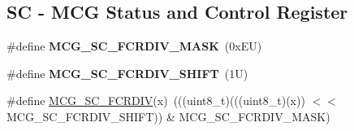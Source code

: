 \subsection*{SC -\/ M\+CG Status and Control Register}
\begin{DoxyCompactItemize}
\item 
\mbox{\label{group___m_c_g___register___masks_ga9b5d58f2f0a68eabe93f088dc2f81d2b}} 
\#define {\bfseries M\+C\+G\+\_\+\+S\+C\+\_\+\+F\+C\+R\+D\+I\+V\+\_\+\+M\+A\+SK}~(0x\+E\+U)
\item 
\mbox{\label{group___m_c_g___register___masks_gacc99cc05a01e5807395bfe11518b26e3}} 
\#define {\bfseries M\+C\+G\+\_\+\+S\+C\+\_\+\+F\+C\+R\+D\+I\+V\+\_\+\+S\+H\+I\+FT}~(1\+U)
\item 
\#define \mbox{\hyperlink{group___m_c_g___register___masks_ga50a0225002267599fa7a2fc341fa783a}{M\+C\+G\+\_\+\+S\+C\+\_\+\+F\+C\+R\+D\+IV}}(x)~(((uint8\+\_\+t)(((uint8\+\_\+t)(x)) $<$$<$ M\+C\+G\+\_\+\+S\+C\+\_\+\+F\+C\+R\+D\+I\+V\+\_\+\+S\+H\+I\+FT)) \& M\+C\+G\+\_\+\+S\+C\+\_\+\+F\+C\+R\+D\+I\+V\+\_\+\+M\+A\+SK)
\end{DoxyCompactItemize}
